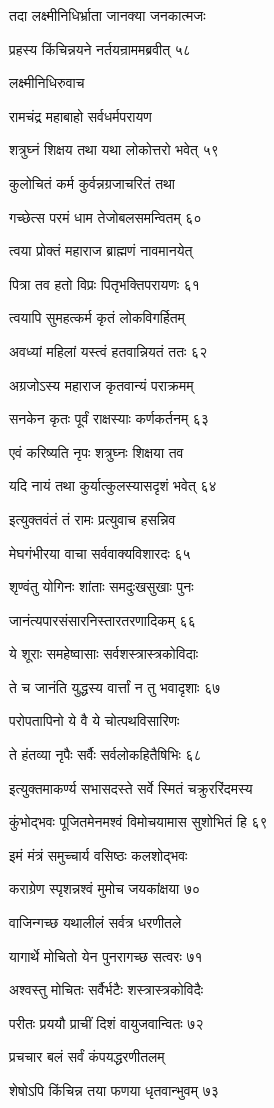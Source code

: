 तदा लक्ष्मीनिधिर्भ्राता जानक्या जनकात्मजः

प्रहस्य किंचिन्नयने नर्तयन्राममब्रवीत् ५८

लक्ष्मीनिधिरुवाच

रामचंद्र महाबाहो सर्वधर्मपरायण

शत्रुघ्नं शिक्षय तथा यथा लोकोत्तरो भवेत् ५९

कुलोचितं कर्म कुर्वन्नग्रजाचरितं तथा

गच्छेत्स परमं धाम तेजोबलसमन्वितम् ६०

त्वया प्रोक्तं महाराज ब्राह्मणं नावमानयेत्

पित्रा तव हतो विप्रः पितृभक्तिपरायणः ६१

त्वयापि सुमहत्कर्म कृतं लोकविगर्हितम्

अवध्यां महिलां यस्त्वं हतवान्नियतं ततः ६२

अग्रजोऽस्य महाराज कृतवान्यं पराक्रमम्

सनकेन कृतः पूर्वं राक्षस्याः कर्णकर्तनम् ६३

एवं करिष्यति नृपः शत्रुघ्नः शिक्षया तव

यदि नायं तथा कुर्यात्कुलस्यासदृशं भवेत् ६४

इत्युक्तवंतं तं रामः प्रत्युवाच हसन्निव

मेघगंभीरया वाचा सर्ववाक्यविशारदः ६५

शृण्वंतु योगिनः शांताः समदुःखसुखाः पुनः

जानंत्यपारसंसारनिस्तारतरणादिकम् ६६

ये शूराः समहेष्वासाः सर्वशस्त्रास्त्रकोविदाः

ते च जानंति युद्धस्य वार्त्तां न तु भवादृशाः ६७

परोपतापिनो ये वै ये चोत्पथविसारिणः

ते हंतव्या नृपैः सर्वैः सर्वलोकहितैषिभिः ६८

इत्युक्तमाकर्ण्य सभासदस्ते सर्वे स्मितं चक्रुररिंदमस्य

कुंभोद्भवः पूजितमेनमश्वं विमोचयामास सुशोभितं हि ६९

इमं मंत्रं समुच्चार्य वसिष्ठः कलशोद्भवः

कराग्रेण स्पृशन्नश्वं मुमोच जयकांक्षया ७०

वाजिन्गच्छ यथालीलं सर्वत्र धरणीतले

यागार्थे मोचितो येन पुनरागच्छ सत्वरः ७१

अश्वस्तु मोचितः सर्वैर्भटैः शस्त्रास्त्रकोविदैः

परीतः प्रययौ प्राचीं दिशं वायुजवान्वितः ७२

प्रचचार बलं सर्वं कंपयद्धरणीतलम्

शेषोऽपि किंचिन्न तया फणया धृतवान्भुवम् ७३

